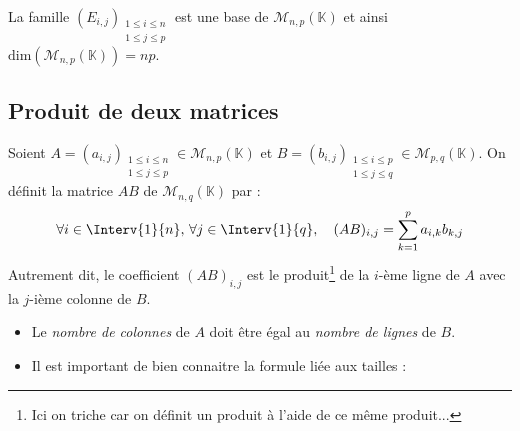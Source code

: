 \documentclass[a4paper,10pt]{report}
\begin{document}
\begin{Proposition}{} La famille $(E_{i,j})_{\substack{1 \leq i \leq n \\ 1 \leq j \leq p}}$ est une base de $\mathcal{M}_{n,p}(\mathbb{K})$ et ainsi $\textrm{dim}(\mathcal{M}_{n,p}(\mathbb{K}))=np$.
\end{Proposition}


\subsection{Produit de deux matrices}

Soient $A=(a_{i,j})_{\substack{1 \leq i \leq n \\ 1 \leq j \leq p}} \in \mathcal{M}_{n,p}(\mathbb{K})$ et $B=(b_{i,j})_{\substack{1 \leq i \leq p \\ 1 \leq j \leq q}} \in \mathcal{M}_{p,q}(\mathbb{K})$. On définit la matrice $AB$ de $\mathcal{M}_{n,q}(\mathbb{K})$ par :
$$ \forall i \in \Interv{1}{n}, \, \forall j \in \Interv{1}{q}, \quad (AB)_{i,j} = \sum_{k=1}^p a_{i,k} b_{k,j}$$
Autrement dit, le coefficient $(AB)_{i,j}$ est le produit\footnote{Ici on triche car on définit un produit à l'aide de ce même produit... } de la $i$-ème ligne de $A$ avec la $j$-ième colonne de $B$.

\medskip

\begin{Remarques}{}
\begin{itemize}
 \item Le \emph{nombre de colonnes} de $A$ doit être égal au \emph{nombre de lignes} de $B$.
\item Il est important de bien connaitre la formule liée aux tailles : 


\begin{center}
\end{center}
\end{itemize}
\end{Remarques}{}
\end{document}

